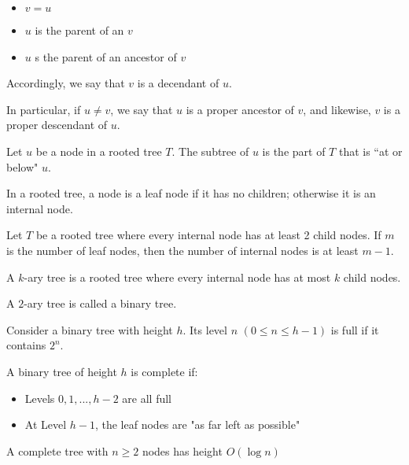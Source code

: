 \documentclass[fontsize=4pt]{scrartcl}
\begin{document}
\begin{multicols}{3}
    \begin{itemize}
        \item $v = u$
        \item $u$ is the parent of an $v$
        \item $u$ s the parent of an ancestor of $v$
    \end{itemize}

    Accordingly, we say that $v$ is a decendant of $u$.

    In particular, if $u \neq v$, we say that $u$ is a proper ancestor of $v$, and likewise, $v$ is a proper descendant of $u$.

    Let $u$ be a node in a rooted tree $T$. The subtree of $u$ is the part of $T$ that is ``at or below" $u$.

    In a rooted tree, a node is a leaf node if it has no children; otherwise it is an internal node.

    Let $T$ be a rooted tree where every internal node has at least 2 child nodes. If $m$ is the number of leaf nodes, then the number of internal nodes is at least $m-1$.

    A $k$-ary tree is a rooted tree where every internal node has at most $k$ child nodes.

    A $2$-ary tree is called a binary tree.

    Consider a binary tree with height $h$. Its level $n$ $(0 \leqslant n \leqslant h - 1)$ is full if it contains $2^n$. 

    A binary tree of height $h$ is complete if:

    \begin{itemize}
        \item Levels $0, 1, ..., h-2$ are all full
        \item At Level $h-1$, the leaf nodes are "as far left as possible"
    \end{itemize}

    A complete tree with $n \geqslant 2$ nodes has height $O(\log n)$






    
\end{multicols}
\end{document}
